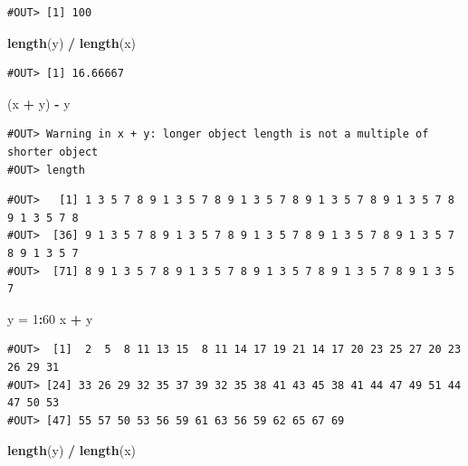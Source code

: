 \documentclass[]{book}
\newenvironment{Shaded}{\begin{snugshade}}{\end{snugshade}}
\newcommand{\KeywordTok}[1]{\textcolor[rgb]{0.13,0.29,0.53}{\textbf{#1}}}
\newcommand{\DecValTok}[1]{\textcolor[rgb]{0.00,0.00,0.81}{#1}}
\newcommand{\StringTok}[1]{\textcolor[rgb]{0.31,0.60,0.02}{#1}}
\newcommand{\OperatorTok}[1]{\textcolor[rgb]{0.81,0.36,0.00}{\textbf{#1}}}
\newcommand{\NormalTok}[1]{#1}
\theoremstyle{definition}
\theoremstyle{definition}
\theoremstyle{definition}
\theoremstyle{remark}
\begin{document}
\begin{verbatim}
#OUT> [1] 100
\end{verbatim}

\begin{Shaded}
\begin{Highlighting}[]
\KeywordTok{length}\NormalTok{(y) }\OperatorTok{/}\StringTok{ }\KeywordTok{length}\NormalTok{(x)}
\end{Highlighting}
\end{Shaded}

\begin{verbatim}
#OUT> [1] 16.66667
\end{verbatim}

\begin{Shaded}
\begin{Highlighting}[]
\NormalTok{(x }\OperatorTok{+}\StringTok{ }\NormalTok{y) }\OperatorTok{-}\StringTok{ }\NormalTok{y}
\end{Highlighting}
\end{Shaded}

\begin{verbatim}
#OUT> Warning in x + y: longer object length is not a multiple of shorter object
#OUT> length
\end{verbatim}

\begin{verbatim}
#OUT>   [1] 1 3 5 7 8 9 1 3 5 7 8 9 1 3 5 7 8 9 1 3 5 7 8 9 1 3 5 7 8 9 1 3 5 7 8
#OUT>  [36] 9 1 3 5 7 8 9 1 3 5 7 8 9 1 3 5 7 8 9 1 3 5 7 8 9 1 3 5 7 8 9 1 3 5 7
#OUT>  [71] 8 9 1 3 5 7 8 9 1 3 5 7 8 9 1 3 5 7 8 9 1 3 5 7 8 9 1 3 5 7
\end{verbatim}

\begin{Shaded}
\begin{Highlighting}[]
\NormalTok{y =}\StringTok{ }\DecValTok{1}\OperatorTok{:}\DecValTok{60}
\NormalTok{x }\OperatorTok{+}\StringTok{ }\NormalTok{y}
\end{Highlighting}
\end{Shaded}

\begin{verbatim}
#OUT>  [1]  2  5  8 11 13 15  8 11 14 17 19 21 14 17 20 23 25 27 20 23 26 29 31
#OUT> [24] 33 26 29 32 35 37 39 32 35 38 41 43 45 38 41 44 47 49 51 44 47 50 53
#OUT> [47] 55 57 50 53 56 59 61 63 56 59 62 65 67 69
\end{verbatim}

\begin{Shaded}
\begin{Highlighting}[]
\KeywordTok{length}\NormalTok{(y) }\OperatorTok{/}\StringTok{ }\KeywordTok{length}\NormalTok{(x)}
\end{Highlighting}
\end{Shaded}
\end{document}
